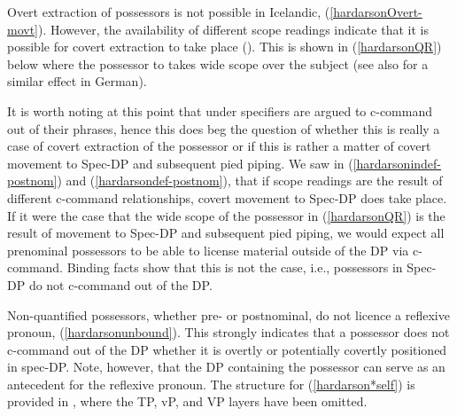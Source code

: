 \documentclass[output=paper,colorlinks,citecolor=brown,
]{langscibook}
\begin{document}
\noindent Overt extraction of possessors is not possible in Icelandic, (\ref{hardarsonOvert-movt}). However, the availability of different scope readings indicate that it is possible for covert extraction to take place (\citealt{Hardarson:2016wd}). This is shown in (\ref{hardarsonQR}) below where the possessor to takes wide scope over the subject (see also \citealt{Wurmbrand:2008wc,Bobaljik:va} for a similar effect in German).

\begin{exe}
\end{exe}

\noindent It is worth noting at this point that under \citet[22ff]{Kayne:1994uo} specifiers are argued to c-command out of their phrases, hence this does beg the question of whether this is really a case of covert extraction of the possessor or if this is rather a matter of covert movement to Spec-DP and subsequent pied piping. We saw in (\ref{hardarsonindef-postnom}) and (\ref{hardarsondef-postnom}), that if scope readings are the result of different c-command relationships, covert movement to Spec-DP does take place. If it were the case that the wide scope of the possessor in (\ref{hardarsonQR}) is the result of movement to Spec-DP and subsequent pied piping, we would expect all prenominal possessors to be able to license material outside of the DP via c-command. Binding facts show that this is not the case, i.e., possessors in Spec-DP do not c-command out of the DP.

Non-quantified possessors, whether pre- or postnominal, do not licence a reflexive pronoun, (\ref{hardarsonunbound}). This strongly indicates that a possessor does not c-com\-mand out of the DP whether it is overtly or potentially covertly positioned in spec-DP. Note, however, that the DP containing the possessor can serve as an antecedent for the reflexive pronoun. The structure for (\ref{hardarson*self}) is provided in , where the TP, vP, and VP layers have been omitted.
\end{document}
